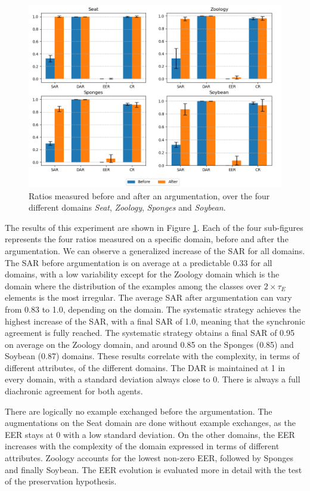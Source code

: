 \begin{figure}
    \centering
    \includegraphics[width=\textwidth]{results/Figure_4_resized.png}
    \caption{Ratios measured before and after an argumentation, over the four different domains \emph{Seat}, \emph{Zoology}, \emph{Sponges} and \emph{Soybean}.}
    \label{fig:ind_intro}
\end{figure}

The results of this experiment are shown in Figure \ref{fig:ind_intro}. Each of the four sub-figures represents the four ratios measured on a specific domain, before and after the argumentation.
We can observe a generalized increase of the SAR for all domains. The SAR before argumentation is on average at a predictable 0.33 for all domains, with a low variability except for the Zoology domain which is the domain where the distribution of the examples among the classes over $2 \times \tau_{E}$ elements is the most irregular. The average SAR after argumentation can vary from 0.83 to 1.0, depending on the domain. The systematic strategy achieves the highest increase of the SAR, with a final SAR of 1.0, meaning that the synchronic agreement is fully reached. The systematic strategy obtains a final SAR of 0.95 on average on the Zoology domain, and around 0.85 on the Sponges (0.85) and Soybean (0.87) domains. These results correlate with the complexity, in terms of different attributes, of the different domains.
The DAR is maintained at 1 in every domain, with a standard deviation always close to 0. There is always a full diachronic agreement for both agents.

There are logically no example exchanged before the argumentation. The augmentations on the Seat domain are done without example exchanges, as the EER stays at 0 with a low standard deviation. On the other domains, the EER increases with the complexity of the domain expressed in terms of different attributes. Zoology accounts for the lowest non-zero EER, followed by Sponges and finally Soybean. The EER evolution is evaluated more in detail with the test of the preservation hypothesis.

